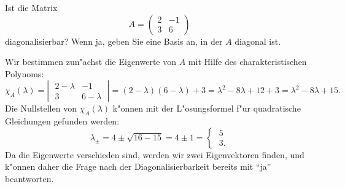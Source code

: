Ist die Matrix
\[
A
=
\begin{pmatrix}
2&-1\\
3& 6
\end{pmatrix}
\]
diagonalisierbar?
Wenn ja, geben Sie eine Basis an, in der $A$ diagonal ist.

\begin{loesung}
Wir bestimmen zun"achst die Eigenwerte von $A$ mit Hilfe des charakteristischen
Polynoms:
\[
\chi_A(\lambda)=\left|\;\begin{matrix}
2-\lambda&        -1\\
        3& 6-\lambda
\end{matrix}\;\right|
=(2-\lambda)(6-\lambda)+3=\lambda^2-8\lambda+12+3
=\lambda^2-8\lambda+15.
\]
Die Nullstellen von $\chi_A(\lambda)$ k"onnen mit der L"osungsformel
f"ur quadratische Gleichungen gefunden werden:
\[
\lambda_{\pm}
=
4\pm\sqrt{16-15}=4\pm 1=\begin{cases}\;5\\\;3.\end{cases}
\]
Da die Eigenwerte verschieden sind, werden wir zwei Eigenvektoren finden,
und k"onnen daher die Frage nach der Diagonalisierbarkeit bereits mit
``ja'' beantworten.


\end{loesung}
